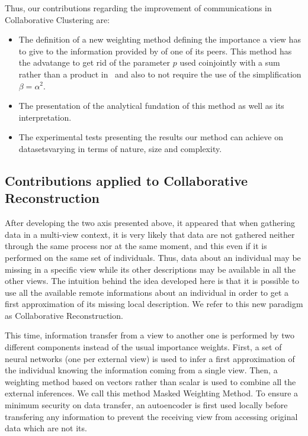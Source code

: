 Thus, our contributions regarding the improvement of communications in Collaborative Clustering are:
\begin{itemize}
    \item The definition of a new weighting method defining the importance a view has to give to the information provided by of one of its peers. This method has the advatange to get rid of the parameter $p$ used coinjointly with a sum rather than a product in~\cite{sublime2017analysis} and also to not require the use of the simplification $\beta = \alpha^2$.
    \item The presentation of the analytical fundation of this method as well as its interpretation.
    \item The experimental tests presenting the results our method can achieve on datasetsvarying in terms of nature, size and complexity.
\end{itemize}

\subsection{Contributions applied to Collaborative Reconstruction}

After developing the two axis presented above, it appeared that when gathering data in a multi-view context, it is very likely that data are not gathered neither through the same process nor at the same moment, and this even if it is performed on the same set of individuals. Thus, data about an individual may be missing in a specific view while its other descriptions may be available in all the other views. The intuition behind the idea developed here is that it is possible to use all the available remote informations about an individual in order to get a first approximation of its missing local description. We refer to this new paradigm as Collaborative Reconstruction.

This time, information transfer from a view to another one is performed by two different components instead of the usual importance weights. First, a set of neural networks (one per external view) is used to infer a first approximation of the individual knowing the information coming from a single view. Then, a weighting method based on vectors rather than scalar is used to combine all the external inferences. We call this method Masked Weighting Method. To ensure a minimum security on data transfer, an autoencoder is first used locally before transfering any information to prevent the receiving view from accessing original data which are not its.


